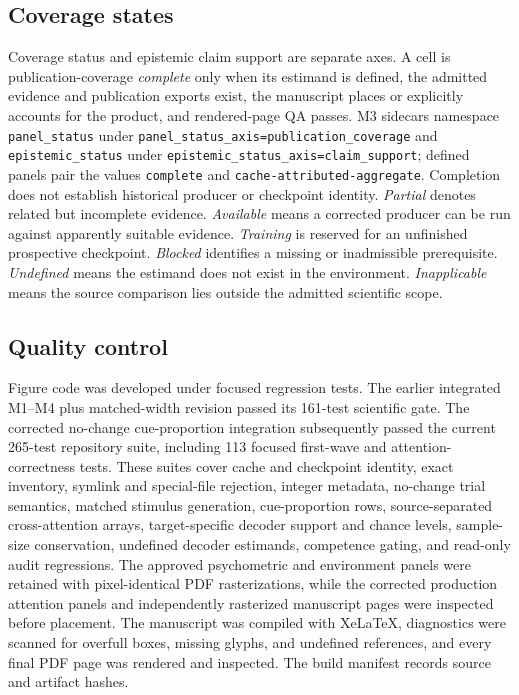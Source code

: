 \documentclass[11pt,a4paper]{article}
\begin{document}
\subsection{Coverage states}
Coverage status and epistemic claim support are separate axes. A cell is publication-coverage \emph{complete} only when its estimand is defined, the admitted evidence and publication exports exist, the manuscript places or explicitly accounts for the product, and rendered-page QA passes. M3 sidecars namespace \texttt{panel\_status} under \texttt{panel\_status\_axis=publication\_coverage} and \texttt{epistemic\_status} under \texttt{epistemic\_status\_axis=claim\_support}; defined panels pair the values \texttt{complete} and \texttt{cache-attributed-aggregate}. Completion does not establish historical producer or checkpoint identity. \emph{Partial} denotes related but incomplete evidence. \emph{Available} means a corrected producer can be run against apparently suitable evidence. \emph{Training} is reserved for an unfinished prospective checkpoint. \emph{Blocked} identifies a missing or inadmissible prerequisite. \emph{Undefined} means the estimand does not exist in the environment. \emph{Inapplicable} means the source comparison lies outside the admitted scientific scope.

\subsection{Quality control}
Figure code was developed under focused regression tests. The earlier integrated M1--M4 plus matched-width revision passed its 161-test scientific gate. The corrected no-change cue-proportion integration subsequently passed the current 265-test repository suite, including 113 focused first-wave and attention-correctness tests. These suites cover cache and checkpoint identity, exact inventory, symlink and special-file rejection, integer metadata, no-change trial semantics, matched stimulus generation, cue-proportion rows, source-separated cross-attention arrays, target-specific decoder support and chance levels, sample-size conservation, undefined decoder estimands, competence gating, and read-only audit regressions. The approved psychometric and environment panels were retained with pixel-identical PDF rasterizations, while the corrected production attention panels and independently rasterized manuscript pages were inspected before placement. The manuscript was compiled with XeLaTeX, diagnostics were scanned for overfull boxes, missing glyphs, and undefined references, and every final PDF page was rendered and inspected. The build manifest records source and artifact hashes.
\end{document}
